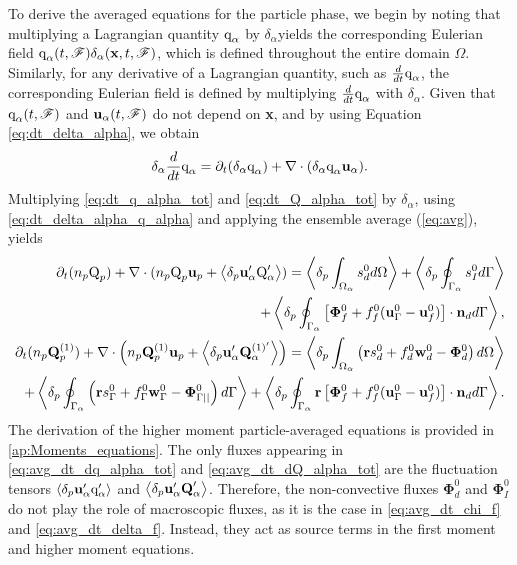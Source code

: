 \documentclass[11pt]{My_preprint}
\begin{document}
To derive the averaged equations for the particle phase, we begin by noting that multiplying a Lagrangian quantity $\text q_\alpha$​ by $\delta_\alpha$​ yields the corresponding Eulerian field  $\text q_\alpha(t,\mathscr{F})\delta_\alpha(\textbf{x},t,\mathscr{F})$, which is defined throughout the entire domain $\Omega$. 
Similarly, for any derivative of a Lagrangian quantity, such as $\frac{d}{dt} \text q_\alpha$​, the corresponding Eulerian field is defined by multiplying $\frac{d}{dt} \text q_\alpha$ with $\delta_\alpha$.
Given that $\text q_\alpha(t,\mathscr{F})$ and $\textbf{u}_\alpha(t,\mathscr{F})$ do not depend on \textbf{x}, and by using Equation \ref{eq:dt_delta_alpha}, we obtain
\begin{equation}
    \delta_\alpha \ddt \text q_\alpha
    = \pddt (\delta_\alpha \text q_\alpha)
    + \div (\delta_\alpha \text q_\alpha \textbf{u}_\alpha).
    \label{eq:dt_delta_alpha_q_alpha}
\end{equation}
Multiplying \ref{eq:dt_q_alpha_tot} and \ref{eq:dt_Q_alpha_tot} by $\delta_\alpha$, using \ref{eq:dt_delta_alpha_q_alpha} and applying the ensemble average (\ref{eq:avg}), yields
\begin{align}
    \pddt (n_p\text Q_p)
    + \div (n_p \text Q_p \textbf{u}_p + \pavg{\textbf{u}_\alpha' \text Q_\alpha'})
    = \pOavg{ s_d^0 }
    + \pSavg{ s_I^0 }\nonumber\\
    + \pSavg{ \left[\mathbf{\Phi}_f^0 + f_f^0 (\textbf{u}_\Gamma^0-\textbf{u}_f^0) \right] \cdot \textbf{n}_d },
    \label{eq:avg_dt_dq_alpha_tot}\\
    \pddt (n_p\textbf{Q}_p^{(1)})
    + \div \left(n_p \textbf{Q}_p^{(1)} \textbf{u}_p + \pavg{\textbf{u}_\alpha' \textbf{Q}_\alpha^{(1)'}}\right)
    =\pOavg{ \left(
        \textbf{r} s_d^0         
        + f_d^0  \textbf{w}_d^0 
        - \mathbf{\Phi}_d^0
    \right) }\nonumber\\
    + \pSavg{ \left(
        \textbf{r}s_\Gamma^0
        + f_\Gamma^0 \textbf{w}_\Gamma^0
        - \mathbf{\Phi}_{\Gamma||}^0
    \right) }
    + \pSavg{ \textbf{r} \left[
        \mathbf{\Phi}_f^0
        + f_f^0 (\textbf{u}_\Gamma^0-\textbf{u}_f^0)
    \right]\cdot \textbf{n}_d  }.
    \label{eq:avg_dt_dQ_alpha_tot}
\end{align}
The derivation of the higher moment particle-averaged equations is provided in \ref{ap:Moments_equations}.
The only fluxes appearing in \ref{eq:avg_dt_dq_alpha_tot} and \ref{eq:avg_dt_dQ_alpha_tot} are the fluctuation tensors $\left<\delta_p \textbf{u}_\alpha' \text q_\alpha'\right>$ and $\left<\delta_p \textbf{u}_\alpha' \textbf{Q}_\alpha'\right>$. 
Therefore, the non-convective fluxes $\bm\Phi_d^0$ and $\bm\Phi_I^0$ do not play the role of macroscopic fluxes, as it is the case in \ref{eq:avg_dt_chi_f} and \ref{eq:avg_dt_delta_f}. Instead, they act as source terms in the first moment and higher moment equations. 
\end{document}
